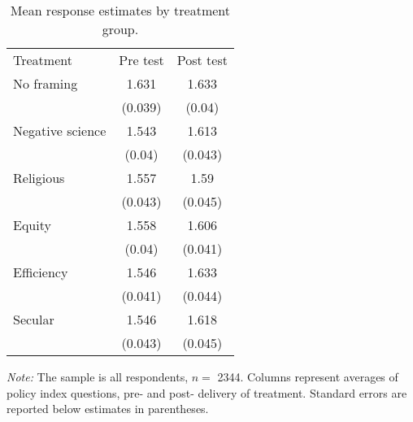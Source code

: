 \begin{table}[H]
\centering
\caption{Mean response estimates by treatment group. \label{tab:means}}
\centering
\begin{threeparttable}
\begin{tabular}[t]{lcc}
\toprule
Treatment & Pre test & Post test\\
\cmidrule(lr){2-3}
No framing & \num{1.631} & \num{1.633}\\
 & (\num{0.039}) & (\num{0.04})\\
\addlinespace
Negative science & \num{1.543} & \num{1.613}\\
 & (\num{0.04}) & (\num{0.043})\\
\addlinespace
Religious & \num{1.557} & \num{1.59}\\
 & (\num{0.043}) & (\num{0.045})\\
\addlinespace
Equity & \num{1.558} & \num{1.606}\\
 & (\num{0.04}) & (\num{0.041})\\
\addlinespace
Efficiency & \num{1.546} & \num{1.633}\\
 & (\num{0.041}) & (\num{0.044})\\
\addlinespace
Secular & \num{1.546} & \num{1.618}\\
 & (\num{0.043}) & (\num{0.045})\\
\bottomrule
\end{tabular}
\begin{tablenotes}
\item \footnotesize \textit{Note:} The sample is all respondents, $n = $ \num{2344}. Columns represent  averages of policy index questions, pre- and post- delivery of treatment. Standard errors are reported below estimates in parentheses.
\end{tablenotes}
\end{threeparttable}
\end{table}
